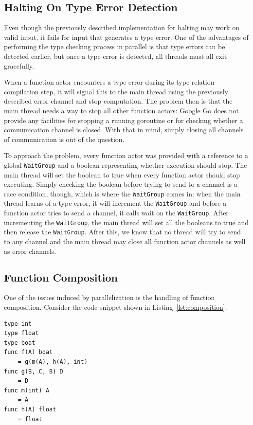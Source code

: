 \documentclass{acm_proc_article-sp}
\begin{document}
	\subsection{Halting On Type Error Detection}

		Even though the previously described implementation for halting may
		work on valid input, it fails for input that generates a type error.
		One of the advantages of performing the type checking process in
		parallel is that type errors can be detected earlier, but once a type
		error is detected, all threads must all exit gracefully. 

		When a function actor encounters a type error during its type relation
		compilation step, it will signal this to the main thread using the
		previously described error channel and stop computation. The problem
		then is that the main thread needs a way to stop all other function
		actors: Google Go does not provide any facilities for stopping a
		running goroutine or for checking whether a communication channel is
		closed. With that in mind, simply closing all channels of communication
		is out of the question.

		To approach the problem, every function actor was provided with a
		reference to a global \texttt{WaitGroup} and a boolean representing
		whether execution should stop. The main thread will set the boolean to
		true when every function actor should stop executing. Simply checking
		the boolean before trying to send to a channel is a race condition,
		though, which is where the \texttt{WaitGroup} comes in: when the main
		thread learns of a type error, it will increment the \texttt{WaitGroup}
		and before a function actor tries to send a channel, it calls wait on
		the \texttt{WaitGroup}. After incrementing the \texttt{WaitGroup}, the
		main thread will set all the booleans to true and then release the
		\texttt{WaitGroup}. After this, we know that no thread will try to send
		to any channel and the main thread may close all function actor
		channels as well as error channels.

	\subsection{Function Composition}
		One of the issues induced by parallelization is the handling of
		function composition. Consider the code snippet shown in 
		Listing~\ref{lst:composition}.

		\begin{lstlisting}[caption=Small Example of function composition,
		language=Paratype, label=lst:composition] 
type int
type float
type boat
func f(A) boat
	= g(m(A), h(A), int)
func g(B, C, B) D
	= D
func m(int) A
	= A
func h(A) float
	= float
		\end{lstlisting}
\end{document}
